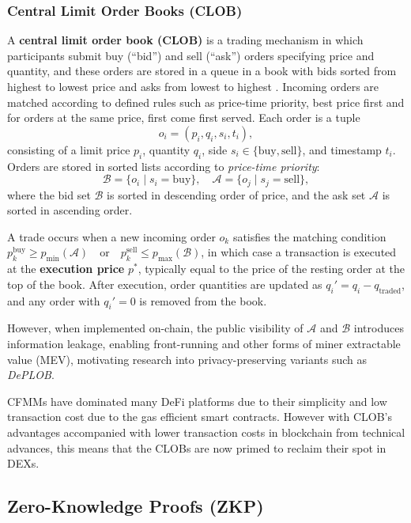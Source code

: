 \documentclass[12pt,a4paper]{article}
\begin{document}
\subsubsection{Central Limit Order Books (CLOB)}
A \textbf{central limit order book (CLOB)} is a trading mechanism in which participants submit buy (“bid”) and sell (“ask”) orders specifying price and quantity, and these orders are stored in a queue in a book with bids sorted from highest to lowest price and asks from lowest to highest \parencite{hagele2024centralized}. Incoming orders are matched according to defined rules such as price-time priority, best price first and for orders at the same price, first come first served.
Each order is a tuple 
\[o_i = (p_i, q_i, s_i, t_i),\]
consisting of a limit price \(p_i\), quantity \(q_i\), side \(s_i \in \{\text{buy}, \text{sell}\}\), and timestamp \(t_i\). Orders are stored in sorted lists according to \textit{price-time priority}:
\[
\mathcal{B} = \{o_i \mid s_i = \text{buy}\}, \quad 
\mathcal{A} = \{o_j \mid s_j = \text{sell}\},
\]
where the bid set \(\mathcal{B}\) is sorted in descending order of price, and the ask set \(\mathcal{A}\) is sorted in ascending order. 

A trade occurs when a new incoming order \(o_k\) satisfies the matching condition $p_k^{\text{buy}} \geq p_{\min}(\mathcal{A})  \quad\text{or}\quad p_k^{\text{sell}} \leq p_{\max}(\mathcal{B})$, in which case a transaction is executed at the \textbf{execution price} \(p^*\), typically equal to the price of the resting order at the top of the book. After execution, order quantities are updated as
$q_i' = q_i - q_{\text{traded}}$,
and any order with \(q_i' = 0\) is removed from the book.

However, when implemented on-chain, the public visibility of \(\mathcal{A}\) and \(\mathcal{B}\) introduces information leakage, enabling front-running and other forms of miner extractable value (MEV), motivating research into privacy-preserving variants such as \textit{DePLOB}.

CFMMs have dominated many DeFi platforms due to their simplicity and low transaction cost due to the gas efficient smart contracts. However with CLOB's advantages accompanied with lower transaction costs in blockchain from technical advances, this means that the CLOBs are now primed to reclaim their spot in DEXs.

\subsection{Zero-Knowledge Proofs (ZKP)}
\end{document}
